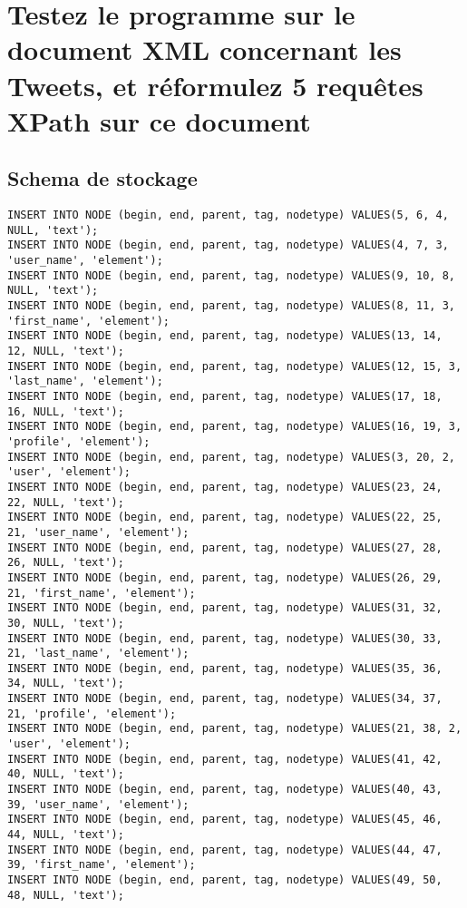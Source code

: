 \section{Testez le programme sur le document XML concernant les Tweets, et réformulez 5 requêtes XPath sur ce document}
\subsection{Schema de stockage}
\begin{verbatim}
INSERT INTO NODE (begin, end, parent, tag, nodetype) VALUES(5, 6, 4, NULL, 'text');
INSERT INTO NODE (begin, end, parent, tag, nodetype) VALUES(4, 7, 3, 'user_name', 'element');
INSERT INTO NODE (begin, end, parent, tag, nodetype) VALUES(9, 10, 8, NULL, 'text');
INSERT INTO NODE (begin, end, parent, tag, nodetype) VALUES(8, 11, 3, 'first_name', 'element');
INSERT INTO NODE (begin, end, parent, tag, nodetype) VALUES(13, 14, 12, NULL, 'text');
INSERT INTO NODE (begin, end, parent, tag, nodetype) VALUES(12, 15, 3, 'last_name', 'element');
INSERT INTO NODE (begin, end, parent, tag, nodetype) VALUES(17, 18, 16, NULL, 'text');
INSERT INTO NODE (begin, end, parent, tag, nodetype) VALUES(16, 19, 3, 'profile', 'element');
INSERT INTO NODE (begin, end, parent, tag, nodetype) VALUES(3, 20, 2, 'user', 'element');
INSERT INTO NODE (begin, end, parent, tag, nodetype) VALUES(23, 24, 22, NULL, 'text');
INSERT INTO NODE (begin, end, parent, tag, nodetype) VALUES(22, 25, 21, 'user_name', 'element');
INSERT INTO NODE (begin, end, parent, tag, nodetype) VALUES(27, 28, 26, NULL, 'text');
INSERT INTO NODE (begin, end, parent, tag, nodetype) VALUES(26, 29, 21, 'first_name', 'element');
INSERT INTO NODE (begin, end, parent, tag, nodetype) VALUES(31, 32, 30, NULL, 'text');
INSERT INTO NODE (begin, end, parent, tag, nodetype) VALUES(30, 33, 21, 'last_name', 'element');
INSERT INTO NODE (begin, end, parent, tag, nodetype) VALUES(35, 36, 34, NULL, 'text');
INSERT INTO NODE (begin, end, parent, tag, nodetype) VALUES(34, 37, 21, 'profile', 'element');
INSERT INTO NODE (begin, end, parent, tag, nodetype) VALUES(21, 38, 2, 'user', 'element');
INSERT INTO NODE (begin, end, parent, tag, nodetype) VALUES(41, 42, 40, NULL, 'text');
INSERT INTO NODE (begin, end, parent, tag, nodetype) VALUES(40, 43, 39, 'user_name', 'element');
INSERT INTO NODE (begin, end, parent, tag, nodetype) VALUES(45, 46, 44, NULL, 'text');
INSERT INTO NODE (begin, end, parent, tag, nodetype) VALUES(44, 47, 39, 'first_name', 'element');
INSERT INTO NODE (begin, end, parent, tag, nodetype) VALUES(49, 50, 48, NULL, 'text');

\end{verbatim}
